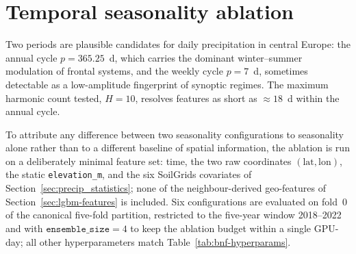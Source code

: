 \section{Temporal seasonality ablation}
\label{sec:bayesnf-seasonality}

Two periods are plausible candidates for daily precipitation in central
Europe: the annual cycle $p = 365{.}25$~d, which carries the dominant
winter--summer modulation of frontal systems, and the weekly cycle
$p = 7$~d, sometimes detectable as a low-amplitude fingerprint of
synoptic regimes. The maximum harmonic count tested, $H = 10$, resolves
features as short as $\approx 18$~d within the annual cycle.

To attribute any difference between two seasonality configurations to
seasonality alone rather than to a different baseline of spatial
information, the ablation is run on a deliberately minimal feature set:
time, the two raw coordinates $(\text{lat}, \text{lon})$, the static
\texttt{elevation\_m}, and the six SoilGrids covariates of
Section~\ref{sec:precip_statistics}; none of the neighbour-derived
geo-features of Section~\ref{sec:lgbm-features} is included. Six configurations are
evaluated on fold~0 of the canonical five-fold partition, restricted
to the five-year window 2018--2022 and with $\texttt{ensemble\_size} =
4$ to keep the ablation budget within a single GPU-day; all other
hyperparameters match Table~\ref{tab:bnf-hyperparams}.


